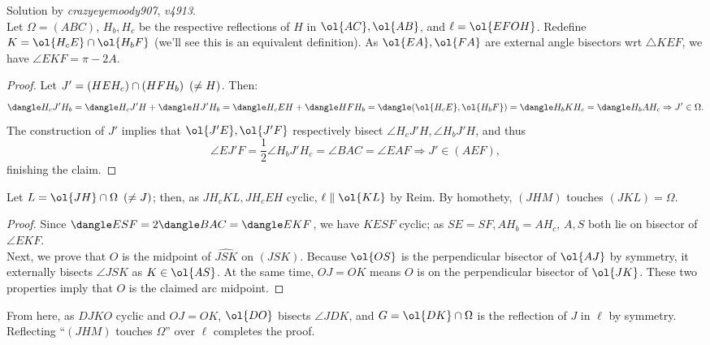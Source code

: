 \documentclass{seto}
\begin{document}
Solution by \emph{crazyeyemoody907}, \emph{v4913}. \\[4pt]
Let $\Omega=(ABC)$, $H_b,H_c$ be the respective reflections of $H$ in
$\ol{AC},\ol{AB}$, and $\ell=\ol{EFOH}$. Redefine $K=\ol{H_cE}\cap\ol{H_bF}$
(we'll see this is an equivalent definition). As $\ol{EA},\ol{FA}$ are external
angle bisectors wrt $\triangle KEF$, we have $\angle EKF=\pi-2A$.
\begin{proof}Let $J'=(HEH_c)\cap(HFH_b)\enskip(\neq H)$. Then:
\[\dangle H_cJ'H_b=\dangle H_cJ'H+\dangle HJ'H_b=\dangle H_cEH+\dangle HFH_b =\dangle(\ol{H_cE},\ol{H_bF})=\dangle H_bKH_c =\dangle H_bAH_c\Rightarrow J'\in\Omega.\]
The construction of $J'$ implies that $\ol{J'E},\ol{J'F}$ respectively bisect $\angle H_cJ'H,\angle H_bJ'H$, and thus
\[\angle EJ'F=\frac12\angle H_bJ'H_c=\angle BAC=\angle EAF\Rightarrow J'\in(AEF),\]
finishing the claim.\end{proof}
Let $L=\ol{JH}\cap\Omega\enskip (\neq J)$; then, as $JH_cKL,JH_cEH$ cyclic, $\ell\parallel\ol{KL}$ by Reim. By homothety, $(JHM)$ touches $(JKL)=\Omega$.
\begin{proof}
Since $\dangle ESF=2\dangle BAC=\dangle EKF$, we have $KESF$ cyclic; as
$SE=SF,AH_b=AH_c$, $A,S$ both lie on bisector of $\angle EKF$.\\
Next, we prove that $O$ is the midpoint of $\widehat{JSK}$ on $(JSK)$. Because
$\ol{OS}$ is the perpendicular bisector of $\ol{AJ}$ by symmetry, it externally
bisects $\angle JSK$ as $K\in\ol{AS}$. At the same time, $OJ=OK$ means $O$ is on
the perpendicular bisector of $\ol{JK}$. These two properties imply that $O$ is
the claimed arc midpoint.
\end{proof}
From here, as $DJKO$ cyclic and $OJ=OK$, $\ol{DO}$ bisects $\angle JDK$, and
$G=\ol{DK}\cap\Omega$ is the reflection of $J$ in $\ell$ by symmetry. Reflecting
``$(JHM)$ touches $\Omega$'' over $\ell$ completes the proof.
\end{document}
